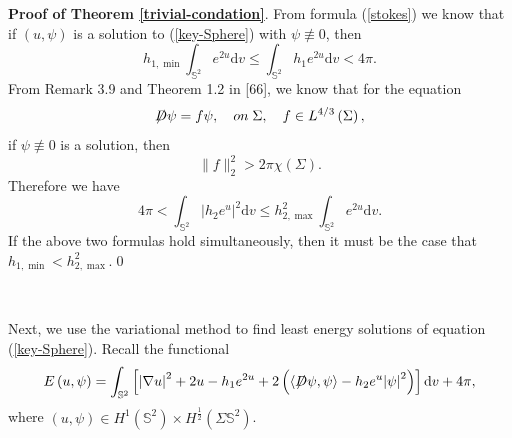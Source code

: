 \documentclass[a4paper, 12pt]{article}
\def\slashiii#1{\setbox0=\hbox{$#1$}#1\hskip-\wd0\hbox to\wd0{\hss\sl/\/\hss}}
\begin{document}
\noindent\textbf{Proof of Theorem \ref{trivial-condation}}. From formula (\ref{stokes}) we know that if $(u,\psi)$ is a solution to (\ref{key-Sphere}) with $\psi\not \equiv0$, then
$$
{h_{1,\min }}\int_{{\mathbb{S}^2}} {{e^{2u}}}  {\text{d}{v}}\leq \int_{{\mathbb{S}^2}} {{h_1}{e^{2u}}} {\text{d}{v}} < 4\pi.
$$
From Remark 3.9 and Theorem 1.2 in [66], we know that for the equation
\[\slashiii{D}\psi  = f\psi ,\quad on\;\Sigma ,\quad f \in {L^{4/3}}\left( \Sigma  \right),\]
if \(\psi \not\equiv 0\) is a solution, then
\[
\|f\|_2^2 > 2\pi \chi(\Sigma).
\]
Therefore we have
\[4\pi  < \int_{{\mathbb{S}^2}} {{{\left| { {h_2}{e^u}} \right|}^2}{\text{d}}v}  \leq h_{2,\max }^2\int_{{\mathbb{S}^2}} {{e^{2u}}} {\text{d}{v}}.\]
If the above two formulas hold simultaneously, then it must be the case that \( h_{1,\min} < h_{2,\max}^2 \).\qed

\
\


Next, we use the variational method to find least energy solutions of equation (\ref{key-Sphere}). Recall the functional
\begin{equation*}
	E\left( {u,\psi } \right) = \int_{{\mathbb{S}^2}} {\left[ {{{\left| {\nabla u} \right|}^2} + 2u - h_1{e^{2u}} + 2\left( {\left\langle {\slashiii{D}\psi ,\psi } \right\rangle  - h_2{e^{u}}{{\left| \psi  \right|}^2}} \right)} \right]{\text{d}{v}}}  + 4\pi,
\end{equation*}
where $\left( {u,\psi } \right) \in {H^1}({\mathbb{S}^2}) \times {H^{\frac{1}{2}}}(\Sigma {\mathbb{S}^2})$.

\end{document}
